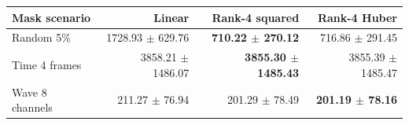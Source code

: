 \begingroup
{}
\begin{tabular}{lrrr}
\toprule
Mask scenario & Linear & Rank-4 squared & Rank-4 Huber \\
\midrule
Random 5\% & 1728.93 $\pm$ 629.76 & \textbf{710.22 $\pm$ 270.12} & 716.86 $\pm$ 291.45 \\
Time 4 frames & 3858.21 $\pm$ 1486.07 & \textbf{3855.30 $\pm$ 1485.43} & 3855.39 $\pm$ 1485.47 \\
Wave 8 channels & 211.27 $\pm$ 76.94 & 201.29 $\pm$ 78.49 & \textbf{201.19 $\pm$ 78.16} \\
\bottomrule
\end{tabular}
\endgroup
